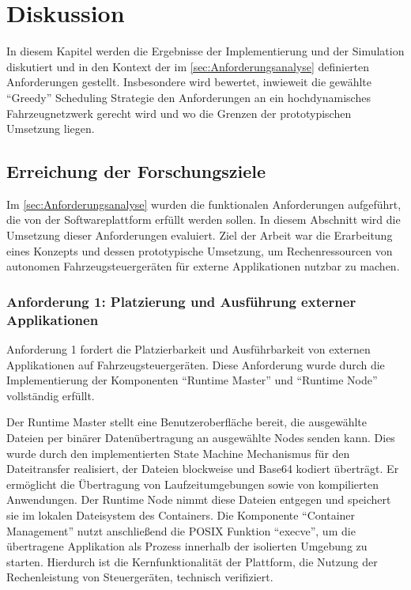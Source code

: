 \chapter{Diskussion}
\label{ch:Diskussion}

In diesem Kapitel werden die Ergebnisse der Implementierung und der Simulation diskutiert und in den Kontext der im \autoref{sec:Anforderungsanalyse} definierten Anforderungen gestellt. Insbesondere wird bewertet, inwieweit die gewählte \enquote{Greedy} Scheduling Strategie den Anforderungen an ein hochdynamisches Fahrzeugnetzwerk gerecht wird und wo die Grenzen der prototypischen Umsetzung liegen.

\section{Erreichung der Forschungsziele}
\label{sec:ErreichungForschungsziele}

Im \autoref{sec:Anforderungsanalyse} wurden die funktionalen Anforderungen aufgeführt, die von der Softwareplattform erfüllt werden sollen. In diesem Abschnitt wird die Umsetzung dieser Anforderungen evaluiert. Ziel der Arbeit war die Erarbeitung eines Konzepts und dessen prototypische Umsetzung, um Rechenressourcen von autonomen Fahrzeugsteuergeräten für externe Applikationen nutzbar zu machen.

\subsection{Anforderung 1: Platzierung und Ausführung externer Applikationen}
Anforderung 1 fordert die Platzierbarkeit und Ausführbarkeit von externen Applikationen auf Fahrzeugsteuergeräten. Diese Anforderung wurde durch die Implementierung der Komponenten \enquote{Runtime Master} und \enquote{Runtime Node} vollständig erfüllt. 

Der Runtime Master stellt eine Benutzeroberfläche bereit, die ausgewählte Dateien per binärer Datenübertragung an ausgewählte Nodes senden kann. Dies wurde durch den implementierten State Machine Mechanismus für den Dateitransfer realisiert, der Dateien blockweise und Base64 kodiert überträgt. Er ermöglicht die Übertragung von Laufzeitumgebungen sowie von kompilierten Anwendungen. Der Runtime Node nimmt diese Dateien entgegen und speichert sie im lokalen Dateisystem des Containers. Die Komponente \enquote{Container Management} nutzt anschließend die POSIX Funktion \enquote{execve}, um die übertragene Applikation als Prozess innerhalb der isolierten Umgebung zu starten. Hierdurch ist die Kernfunktionalität der Plattform, die Nutzung der Rechenleistung von Steuergeräten, technisch verifiziert.

